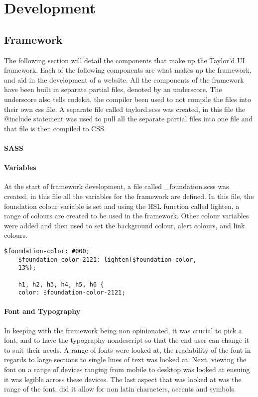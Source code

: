 \newpage
\part{Development}
\chapter*{Framework}
The following section will detail the components that make up the Taylor'd UI framework. Each of the following components are what makes up the framework, and aid in the development of a website. All the components of the framework have been built in separate partial files, denoted by an underscore. The underscore also tells codekit, the compiler been used to not compile the files into their own css file. A separate file called taylord.scss was created, in this file the @include statement was used to pull all the separate partial files into one file and that file is then compiled to CSS. 

\subsection{SASS}

\subsection{Variables}
At the start of framework development, a file called \_foundation.scss was created, in this file all the variables for the framework are defined. In this file, the foundation colour variable is set and using the HSL function called lighten, a range of colours are created to be used in the framework. Other colour variables were added and then used to set the background colour, alert colours, and link colours.

\begin{lstlisting}[language=CSS3]
	$foundation-color: #000;
	$foundation-color-2121: lighten($foundation-color, 
	13%);

	h1, h2, h3, h4, h5, h6 {
  	color: $foundation-color-2121;
\end{lstlisting}

\subsection{Font and Typography}
In keeping with the framework being non opinionated, it was crucial to pick a font, and to have the typography nondescript so that the end user can change it to suit their needs. A range of fonts were looked at, the readability of the font in regards to large sections to single lines of text was looked at. Next, viewing the font on a range of devices ranging from mobile to desktop was looked at ensuing it was legible across these devices. The last aspect that was looked at was the range of the font, did it allow for non latin characters, accents and symbols. 

